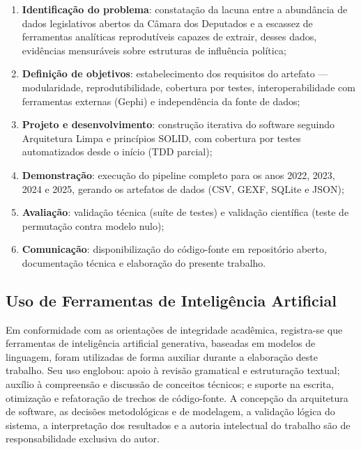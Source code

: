 \documentclass[
      12pt,
      a4paper,
      openright,
      oneside,
      chapter=TITLE,
      section=TITLE,
      english,
      french,
      spanish,
      brazilian
    ]{abntex2}
\begin{document}
    \begin{enumerate}[label=\alph*)]
        \item \textbf{Identificação do problema}: constatação da lacuna entre a abundância de dados legislativos abertos da Câmara dos Deputados e a escassez de ferramentas analíticas reprodutíveis capazes de extrair, desses dados, evidências mensuráveis sobre estruturas de influência política;
    
        \item \textbf{Definição de objetivos}: estabelecimento dos requisitos do artefato --- modularidade, reprodutibilidade, cobertura por testes, interoperabilidade com ferramentas externas (Gephi) e independência da fonte de dados;
    
        \item \textbf{Projeto e desenvolvimento}: construção iterativa do software seguindo Arquitetura Limpa \cite{martin2017} e princípios SOLID, com cobertura por testes automatizados desde o início (TDD parcial);
    
        \item \textbf{Demonstração}: execução do pipeline completo para os anos 2022, 2023, 2024 e 2025, gerando os artefatos de dados (CSV, GEXF, SQLite e JSON);
    
        \item \textbf{Avaliação}: validação técnica (suíte de testes) e validação científica (teste de permutação contra modelo nulo);
    
        \item \textbf{Comunicação}: disponibilização do código-fonte em repositório aberto, documentação técnica e elaboração do presente trabalho.
    \end{enumerate}
    
    \subsection{Uso de Ferramentas de Inteligência Artificial}
    
    Em conformidade com as orientações de integridade acadêmica, registra-se que ferramentas de inteligência artificial generativa, baseadas em modelos de linguagem, foram utilizadas de forma auxiliar durante a elaboração deste trabalho. Seu uso englobou: apoio à revisão gramatical e estruturação textual; auxílio à compreensão e discussão de conceitos técnicos; e suporte na escrita, otimização e refatoração de trechos de código-fonte. A concepção da arquitetura de software, as decisões metodológicas e de modelagem, a validação lógica do sistema, a interpretação dos resultados e a autoria intelectual do trabalho são de responsabilidade exclusiva do autor.
    
\end{document}
